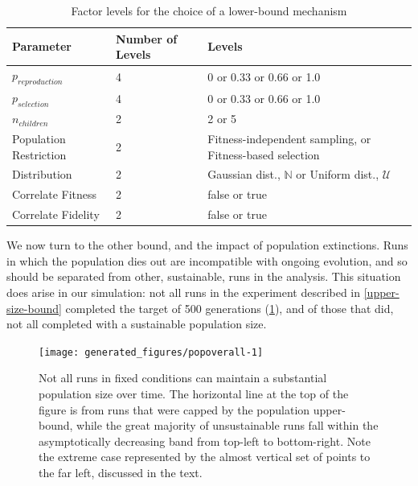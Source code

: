


\begin{table} %
	\begin{center}
		\caption{Factor levels for the choice of a lower-bound mechanism}
		\label{tbl:factor-levels-for-the-choice-of-a-lower-bound-mechanism}
		\begin{tabular}{@{}llp{6cm}@{}}
			\toprule
			Parameter              & Number of Levels & Levels                                                       \\
			\midrule
			$p_{reproduction}$     & 4                & 0 or 0.33 or 0.66 or 1.0                                     \\
			$p_{selection}$        & 4                & 0 or 0.33 or 0.66 or 1.0                                     \\
			$n_{children}$         & 2                & 2 or 5                                                       \\
			Population Restriction & 2                & Fitness-independent sampling, or Fitness-based selection     \\
			Distribution           & 2                & Gaussian dist., $\mathbb{N}$ or Uniform dist., $\mathcal{U}$ \\
			Correlate Fitness      & 2                & false or true                                                \\
			Correlate Fidelity     & 2                & false or true                                                \\
			\bottomrule
		\end{tabular}
	\end{center}
\end{table}

We now turn to the other bound, and the impact of population extinctions. Runs in which the population dies out are incompatible with ongoing evolution, and so should be separated from other, sustainable, runs in the analysis. This situation does arise in our simulation: not all runs in the experiment described in \ref{upper-size-bound} completed the target of 500 generations (\cref{fig:popoverall}), and of those that did, not all completed with a sustainable population size.

\begin{knitrout}
\color{fgcolor}\begin{figure}[htp]
\texttt{[image: generated\_figures/popoverall-1]} \caption[Not all runs in fixed conditions can maintain a substantial population size over time]{Not all runs in fixed conditions can maintain a substantial population size over time. The horizontal line at the top of the figure is from runs that were capped by the population upper-bound, while the great majority of unsustainable runs fall within the asymptotically decreasing band from top-left to bottom-right. Note the extreme case represented by the almost vertical set of points to the far left, discussed in the text.}\label{fig:popoverall}
\end{figure}


\end{knitrout}

